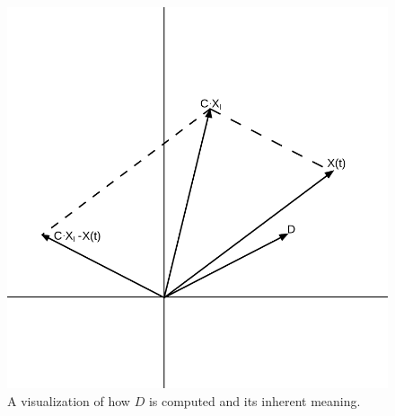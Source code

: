 \begin{figure}[h!]
	\centering
	\includegraphics[scale=0.45]{./images/chap05-methodology/gwo-d-effect.png}
	\caption{A visualization of how $D$ is computed and its inherent meaning.}
	\label{gwo-d-effect}
\end{figure}

